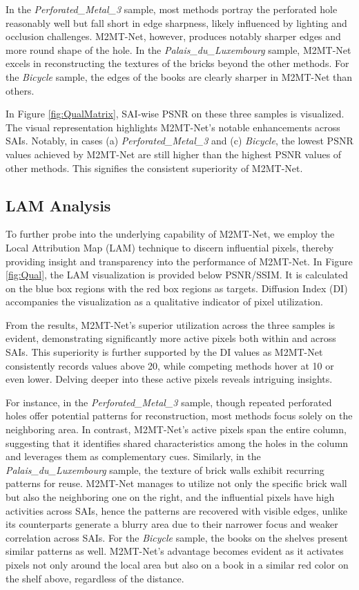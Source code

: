 In the \textit{Perforated\_Metal\_3} sample, most methods portray the perforated hole reasonably well but fall short in edge sharpness, likely influenced by lighting and occlusion challenges. M2MT-Net, however, produces notably sharper edges and more round shape of the hole. In the \textit{Palais\_du\_Luxembourg} sample, M2MT-Net excels in reconstructing the textures of the bricks beyond the other methods. For the \textit{Bicycle} sample, the edges of the books are clearly sharper in M2MT-Net than others.

In Figure \ref{fig:QualMatrix}, SAI-wise PSNR on these three samples is visualized. The visual representation highlights M2MT-Net's notable enhancements across SAIs. Notably, in cases (a) \textit{Perforated\_Metal\_3} and (c) \textit{Bicycle}, the lowest PSNR values achieved by M2MT-Net are still higher than the highest PSNR values of other methods. This signifies the consistent superiority of M2MT-Net.

\subsection{LAM Analysis} To further probe into the underlying capability of M2MT-Net, we employ the Local Attribution Map (LAM) technique \cite{guLAM_CVPR2021} to discern influential pixels, thereby providing insight and transparency into the performance of M2MT-Net. In Figure \ref{fig:Qual}, the LAM visualization is provided below PSNR/SSIM. It is calculated on the blue box regions with the red box regions as targets. Diffusion Index (DI) accompanies the visualization as a qualitative indicator of pixel utilization.

From the results, M2MT-Net's superior utilization across the three samples is evident, demonstrating significantly more active pixels both within and across SAIs. This superiority is further supported by the DI values as M2MT-Net consistently records values above 20, while competing methods hover at 10 or even lower. Delving deeper into these active pixels reveals intriguing insights.

For instance, in the \textit{Perforated\_Metal\_3} sample, though repeated perforated holes offer potential patterns for reconstruction, most methods focus solely on the neighboring area. In contrast, M2MT-Net's active pixels span the entire column, suggesting that it identifies shared characteristics among the holes in the column and leverages them as complementary cues. 
Similarly, in the \textit{Palais\_du\_Luxembourg} sample, the texture of brick walls exhibit recurring patterns for reuse. M2MT-Net manages to utilize not only the specific brick wall but also the neighboring one on the right, and the influential pixels have high activities across SAIs, hence the patterns are recovered with visible edges, unlike its counterparts generate a blurry area due to their narrower focus and weaker correlation across SAIs.
For the \textit{Bicycle} sample, the books on the shelves present similar patterns as well. M2MT-Net's advantage becomes evident as it activates pixels not only around the local area but also on a book in a similar red color on the shelf above, regardless of the distance.

